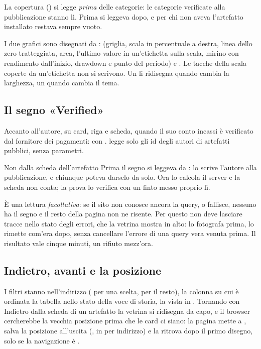 La copertura () si legge \emph{prima}
delle categorie: le categorie verificate alla pubblicazione stanno lì. Prima
si leggeva dopo, e per chi non aveva l'artefatto installato 
restava sempre vuoto.

I due grafici sono  disegnati da
:  (griglia, scala in
percentuale a destra, linea dello zero tratteggiata, area, l'ultimo valore
in un'etichetta sulla scala, mirino con rendimento dall'inizio, drawdown e
punto del periodo) e . Le tacche della scala coperte da
un'etichetta non si scrivono. Un  li ridisegna quando
cambia la larghezza, un  quando cambia il tema.

\subsection{Il segno «Verified»}

Accanto all'autore, su card, riga e scheda, quando il suo conto incassi è
verificato dal fornitore dei pagamenti:  con . 
legge solo gli id degli autori di artefatti pubblici, senza parametri.

\begin{attenzione}{Non dalla scheda dell'artefatto}
Prima il segno si leggeva da :  lo scrive
l'autore alla pubblicazione, e chiunque poteva darselo da solo. Ora lo calcola
il server e la scheda non conta; la prova lo verifica con un
 finto messo proprio lì.
\end{attenzione}

\noindent
È una lettura \emph{facoltativa}: se il sito non conosce ancora la query, o
fallisce, nessuno ha il segno e il resto della pagina non ne risente. Per
questo non deve lasciare tracce nello stato degli errori, che la vetrina
mostra in alto:  lo fotografa prima,
 lo rimette com'era dopo, senza cancellare
l'errore di una query vera venuta prima. Il risultato vale cinque minuti, un
rifiuto mezz'ora.

\subsection{Indietro, avanti e la posizione}

I filtri stanno nell'indirizzo ( per una scelta,
 per il resto), la colonna su cui è ordinata la tabella
nello stato della voce di storia, la vista in . Tornando
con Indietro dalla scheda di un artefatto la vetrina si ridisegna da capo, e
il browser cercherebbe la vecchia posizione prima che le card ci siano: la
pagina mette  a , salva la
posizione all'uscita (, in  per indirizzo) e
la ritrova dopo il primo disegno, solo se la navigazione è
.

